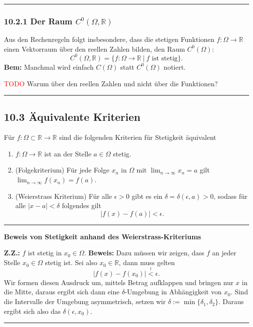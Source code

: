 \documentclass[a4paper,landscape,8pt]{extarticle}
\newcommand{\R}{\mathbb{R}}
\newcommand{\abs}[1]{\left\lvert #1 \right\rvert}
\newcommand{\setsep}{\ \vert \ }
\newcommand{\todo}{\textcolor{red}{TODO }}
\newcommand{\sep}{\vspace{5pt}\noindent\hrule\vspace{5pt}}
\newcommand{\ZZ}{\textbf{Z.Z.: }}
\newcommand{\Bem}{\textbf{Bem: }}
\newcommand{\Beweis}{\textbf{Beweis: }}
\begin{document}
\begin{multicols*}{4}
\begin{warmup}
\sep
\end{warmup}

\subsubsection{10.2.1 Der Raum $C^0(\Omega,\R)$}

\Def Aus den Rechenregeln folgt insbesondere, dass die stetigen Funktionen
$f\colon\Omega\to\R$ einen Vektorraum über den reellen Zahlen bilden, den Raum
$C^0(\Omega)$:
\[
C^0(\Omega,\R) = \{f\colon\Omega\to\R\setsep f \text{ ist stetig}\}.
\]
\Bem Manchmal wird einfach $C(\Omega)$ statt $C^0(\Omega)$ notiert.

\todo Warum über den reellen Zahlen und nicht über die Funktionen?

\sep

\subsection{10.3 Äquivalente Kriterien}

\Satz Für $f\colon\Omega\subset\R\to\R$ sind die folgenden Kriterien für
Stetigkeit äquivalent
\begin{enumerate}[label=(\alph*)]
  \item $f\colon\Omega\to\R$ ist an der Stelle $a\in\Omega$ stetig.
  \item (Folgekriterium) Für jede Folge $x_n$ in $\Omega$ mit
  $\lim_{n\to\infty} x_n=a$ gilt $\lim_{n\to\infty}f(x_n)=f(a)$.
  \item (Weierstrass Kriterium) Für alle $\epsilon > 0$ gibt es ein $\delta =
  \delta(\epsilon, a)>0	$, sodass für alle $\abs{x-a}<\delta$ folgendes gilt
  \[
  \abs{f(x)-f(a)}<\epsilon.
  \]
\end{enumerate}

\sep

\textbf{Beweis von Stetigkeit anhand des Weierstrass-Kriteriums}

\Vorgehen \ZZ $f$ ist stetig in
$x_0\in\Omega$.
\Beweis Dazu müssen wir zeigen, dass $f$ an jeder Stelle $x_0\in\Omega$ stetig ist. Sei also $x_0\in\R$, dann muss gelten 
 \[
\abs{f(x)-f(x_0)}\stackrel{!}{<} \epsilon.
\]
Wir formen diesen Ausdruck um, mittels Betrag aufklappen und bringen nur $x$ in
die Mitte, daraus ergibt sich dann eine $\delta$-Umgebung in Abhängigkeit von
$x_0$. Sind die Intervalle der Umgebung asymmetrisch, setzen wir
$\delta:=\min\{\delta_1,\delta_2\}$. Daraus ergibt sich also das
$\delta(\epsilon,x_0)$.

\sep


\end{multicols*}
\end{document}
